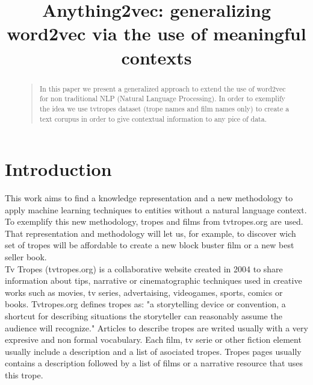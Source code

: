\documentclass[letterpaper]{article}
\title{Anything2vec: generalizing word2vec via the use of meaningful
	contexts}
\begin{document}
 
	\maketitle
	\begin{abstract}
		\begin{quote}
			In this paper we present a generalized approach to extend the use of word2vec for non traditional NLP (Natural Language Processing). In order to exemplify the idea we use tvtropes dataset (trope names and film names only) to create a text corupus in order to give contextual information to any pice of data.
		\end{quote}
	\end{abstract}
	
	
	
	
	
	\section{Introduction}
	
	
	This work aims to find a knowledge representation and a new methodology to apply machine learning techniques to entities without a natural language context. To exemplify this new methodology, tropes and films from tvtropes.org are used. That representation and methodology will let us, for example, to discover wich set of tropes will be affordable to create a new block buster film or a new best seller book.   \\
	
	Tv Tropes (tvtropes.org) is a collaborative website created in 2004 to share information about tips, narrative or cinematographic techniques used in creative works such as movies, tv series, advertaising, videogames, sports, comics or books. Tvtropes.org defines tropes as: "a storytelling device or convention, a shortcut for describing situations the storyteller can reasonably assume the audience will recognize." Articles to describe tropes are writed usually with a very expresive and non formal vocabulary. Each film, tv serie or other fiction element usually include a description and a list of asociated tropes. Tropes pages usually contains a description followed by a list of films or a narrative resource that uses this trope.\\
	
\end{document}
